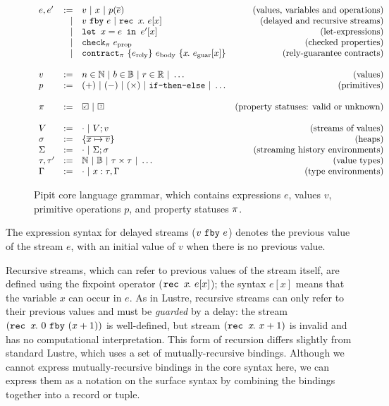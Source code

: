 \documentclass[a4paper,UKenglish,cleveref, autoref, thm-restate,anonymous]{lipics-v2021}
\begin{document}
\begin{figure}
  \[
  \begin{array}{lrlr}
    e, e' & := & v ~|~ x ~|~ p(\ov{e}) & \mbox{(values, variables and operations)} \\
          & | & \xfby{v}{e} ~|~ \xrec{x}{e[x]} & \mbox{(delayed and recursive streams)} \\ & | & \xlet{x}{e}{e'[x]} & \mbox{(let-expressions)}\\
          & | & \xcheckP{\PStatus}{e_{\text{prop}}} & \mbox{(checked properties)} \\
          & | & \xcontractP{\PStatus}{\erely}{\ebody}{\rawbind{x}{\eguar[x]}} & \mbox{(rely-guarantee contracts)} \\
\\
    v & := & n \in \mathbb{N} ~|~ b \in \mathbb{B} ~|~ r \in \mathbb{R} ~|~ \hdots  & \mbox{(values)} \\
    p & := & (+) ~|~ (-) ~|~ (\times) ~|~ \tt{if-then-else} ~|~ \hdots & \mbox{(primitives)} \\
    \\
    \PStatus & := & \PSValid ~|~ \PSUnknown & \mbox{(property statuses: valid or unknown)}\\
    \\
    V & := & \cdot ~|~ V;v & \mbox{(streams of values)} \\
    \sigma & := & \sgl{\ov{x \mapsto v}} & \mbox{(heaps)} \\
    \Sigma & := & \cdot ~|~ \Sigma;\sigma & \mbox{(streaming history environments)} \\
\tau, \tau' & := & \mathbb{N} ~|~ \mathbb{B} ~|~ \tau \times \tau ~|~ \hdots & \mbox{(value types)} \\
    \Gamma & := & \cdot ~|~ x : \tau, \Gamma & \mbox{(type environments)}  \\
    \end{array}
  \]
  \caption{Pipit core language grammar, which contains expressions $e$, values $v$, primitive operations $p$, and property statuses $\pi$.}
  \label{f:core-grammar}
\end{figure} 
The expression syntax for delayed streams ($v~\texttt{fby}~e$) denotes the previous value of the stream $e$, with an initial value of $v$ when there is no previous value.


Recursive streams, which can refer to previous values of the stream itself, are defined using the fixpoint operator ($\texttt{rec~} x\hspace{-0.1em}.~e[x]$); the syntax $e[x]$ means that the variable $x$ can occur in $e$.
As in Lustre, recursive streams can only refer to their previous values and must be \emph{guarded} by a delay: the stream $(\texttt{rec~} x\hspace{-0.1em}.~0~\texttt{fby}~(x + 1))$ is well-defined, but stream $(\texttt{rec~} x\hspace{-0.1em}.~x + 1)$ is invalid and has no computational interpretation.
This form of recursion differs slightly from standard Lustre, which uses a set of mutually-recursive bindings.
Although we cannot express mutually-recursive bindings in the core syntax here, we can express them as a notation on the surface syntax by combining the bindings together into a record or tuple.
\end{document}

